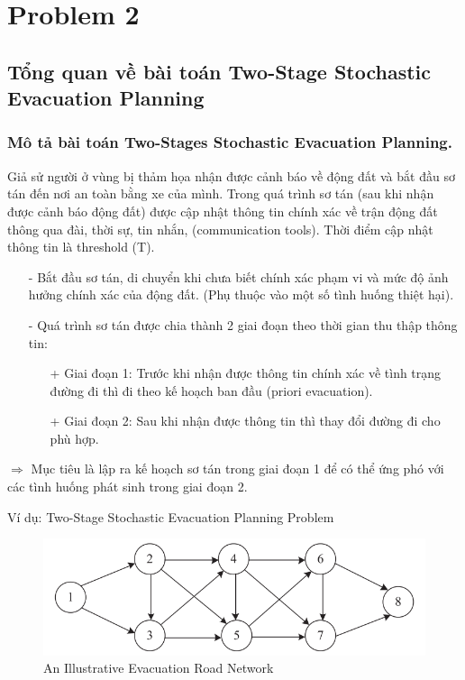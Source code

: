 \documentclass[a4paper]{article}
\begin{document}
\section{Problem 2}
\subsection{Tổng quan về bài toán Two-Stage Stochastic Evacuation Planning}
\subsubsection{Mô tả bài toán Two-Stages Stochastic Evacuation Planning. }
{Giả sử người ở vùng bị thảm họa nhận được cảnh báo về động đất và bắt đầu sơ tán đến nơi an toàn bằng xe của mình. Trong quá trình sơ tán (sau khi nhận được cảnh báo động đất) được cập nhật thông tin chính xác về trận động đất thông qua đài, thời sự, tin nhắn, (communication tools). Thời điểm cập nhật thông tin là threshold (T).}
\begin{enumerate}
    \item[-] {Bắt đầu sơ tán, di chuyển khi chưa biết chính xác phạm vi và mức độ ảnh hưởng chính xác của động đất. (Phụ thuộc vào một số tình huống thiệt hại).}
    \item[-] {Quá trình sơ tán được chia thành 2 giai đoạn theo thời gian thu thập thông tin:}
    \begin{enumerate}
        \item[+] {Giai đoạn 1: Trước khi nhận được thông tin chính xác về tình trạng đường đi thì đi theo kế hoạch ban đầu (priori evacuation). }
        \item[+] {Giai đoạn 2: Sau khi nhận được thông tin thì thay đổi đường đi cho phù hợp.} 
    \end{enumerate}
\end{enumerate}
 \(\Rightarrow\) {Mục tiêu là lập ra kế hoạch sơ tán trong giai đoạn 1 để có thể ứng phó với các tình huống phát sinh trong giai đoạn 2.}

 {Ví dụ: Two-Stage Stochastic Evacuation Planning Problem}
 \begin{figure}[h]
     \centering
     \includegraphics[scale=0.7]{road_network.png}
     \caption{An Illustrative Evacuation Road Network}
     \label{fig:enter-label}
 \end{figure}
 
\end{document}
